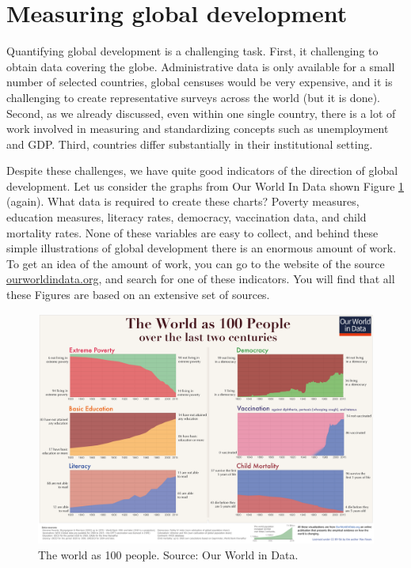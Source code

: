 \documentclass[]{book}
\begin{document}
\hypertarget{measuring-global-development}{%
\section{Measuring global development}\label{measuring-global-development}}

Quantifying global development is a challenging task. First, it challenging to obtain data covering the globe. Administrative data is only
available for a small number of selected countries, global censuses would be very expensive, and it is challenging to create representative surveys across the world (but it is done). Second, as we already discussed, even within one single country, there is a lot of work involved in measuring and standardizing concepts such as unemployment and GDP. Third, countries differ substantially in their institutional setting.

Despite these challenges, we have quite good indicators of the direction of global development. Let us consider the graphs from Our World In Data shown Figure \ref{fig:poverty4} (again). What data is required to create these charts? Poverty measures, education measures, literacy rates, democracy, vaccination data, and child mortality rates. None of these variables are easy to collect, and behind these simple illustrations of global development there is an enormous amount of work. To get an idea of the amount of work, you can go to the website of the source \href{https://www.ourworldindata.org}{ourworldindata.org}, and search for one of these indicators. You will find that all these Figures are based on an extensive set of sources.

\begin{figure}

{\centering \includegraphics[width=0.8\linewidth]{_resources/chapter_inequality/fig1} 

}

\caption{The world as 100 people. Source: Our World in Data. }\label{fig:poverty4}
\end{figure}
\end{document}
